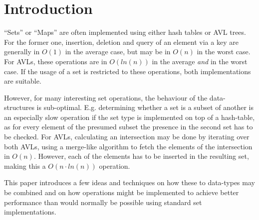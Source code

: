 \section{Introduction}


    ``Sets'' or ``Maps'' are often implemented using either hash tables or AVL
    trees.  For the former one, insertion, deletion and query of an element via
    a key are generally in $O(1)$ in the average case, but may be in $O(n)$ in
    the worst case.  For AVLs, these operations are in $O(ln(n))$ in the average
    \emph{and} in the worst case. If the usage of a set is restricted to these
    operations, both implementations are suitable.

    However, for many interesting set operations, the behaviour of the
    data-structures is sub-optimal. E.g. determining whether a set is a subset
    of another is an especially slow operation if the set type is implemented on
    top of a hash-table, as for every element of the presumed subset the
    presence in the second set has to be checked. For AVLs, calculating an
    intersection may be done by iterating over both AVLs, using a merge-like
    algorithm to fetch the elements of the intersection in $O(n)$. However, each
    of the elements has to be inserted in the resulting set, making this a
    $O(n\cdot ln(n))$ operation.

    This paper introduces a few ideas and techniques on how these to data-types
    may be combined and on how operations might be implemented to achieve better
    performance than would normally be possible using standard set
    implementations.

